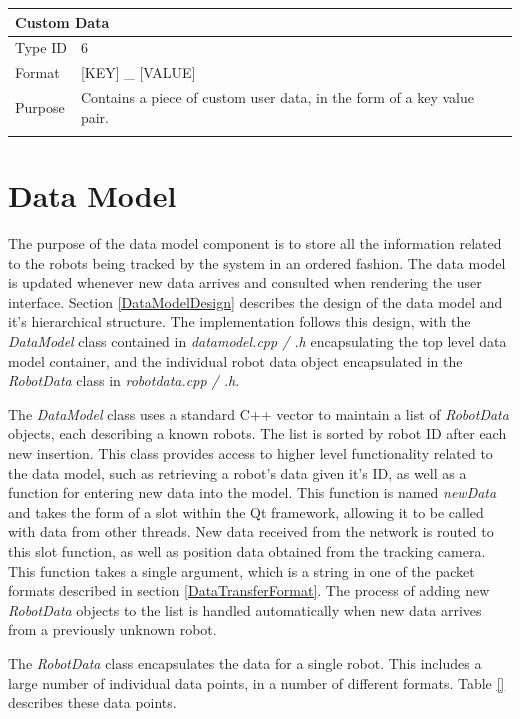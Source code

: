 \begin{longtable}{ l p{12cm} }
 \hline
 \multicolumn{2}{p{12cm}}{\textbf{Custom Data}}\\
 \hline
 Type ID & 6 \\
 Format & [KEY] \_ [VALUE]\\
 Purpose & Contains a piece of custom user data, in the form of a key value pair. \\
	
 \label{tab:DataFormat}
\end{longtable}


\section{Data Model} \label{DataModel}
The purpose of the data model component is to store all the information related to the robots being tracked by the system in an ordered fashion. The data model is updated whenever new data arrives and consulted when rendering the user interface. Section \ref{DataModelDesign} describes the design of the data model and it's hierarchical structure. The implementation follows this design, with the \textit{DataModel} class contained in \textit{datamodel.cpp / .h} encapsulating the top level data model container, and the individual robot data object encapsulated in the \textit{RobotData} class in \textit{robotdata.cpp / .h}. 

The \textit{DataModel} class uses a standard C++ vector to maintain a list of \textit{RobotData} objects, each describing a known robots. The list is sorted by robot ID after each new insertion. This class provides access to higher level functionality related to the data model, such as retrieving a robot's data given it's ID, as well as a function for entering new data into the model. This function is named \textit{newData} and takes the form of a slot within the Qt framework, allowing it to be called with data from other threads. New data received from the network is routed to this slot function, as well as position data obtained from the tracking camera. This function takes a single argument, which is a string in one of the packet formats described in section \ref{DataTransferFormat}. The process of adding new \textit{RobotData} objects to the list is handled automatically when new data arrives from a previously unknown robot.

The \textit{RobotData} class encapsulates the data for a single robot. This includes a large number of individual data points, in a number of different formats. Table \ref{} describes these data points.

